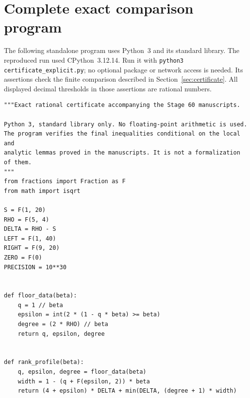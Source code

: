 \documentclass[11pt,letterpaper]{article}
\theoremstyle{definition}
\begin{document}
\section{Complete exact comparison program}\label{app:certificate-code}
The following standalone program uses Python~3 and its standard library.
The reproduced run used CPython~3.12.14. Run it with
\texttt{python3 certificate\_explicit.py}; no optional package or network
access is needed. Its assertions check the finite comparison described in
Section~\ref{sec:certificate}. All displayed decimal thresholds in those
assertions are rational numbers.
\begin{lstlisting}
"""Exact rational certificate accompanying the Stage 60 manuscripts.

Python 3, standard library only. No floating-point arithmetic is used.
The program verifies the final inequalities conditional on the local and
analytic lemmas proved in the manuscripts. It is not a formalization of them.
"""
from fractions import Fraction as F
from math import isqrt

S = F(1, 20)
RHO = F(5, 4)
DELTA = RHO - S
LEFT = F(1, 40)
RIGHT = F(9, 20)
ZERO = F(0)
PRECISION = 10**30


def floor_data(beta):
    q = 1 // beta
    epsilon = int(2 * (1 - q * beta) >= beta)
    degree = (2 * RHO) // beta
    return q, epsilon, degree


def rank_profile(beta):
    q, epsilon, degree = floor_data(beta)
    width = 1 - (q + F(epsilon, 2)) * beta
    return (4 + epsilon) * DELTA + min(DELTA, (degree + 1) * width)



\end{lstlisting}
\end{document}
